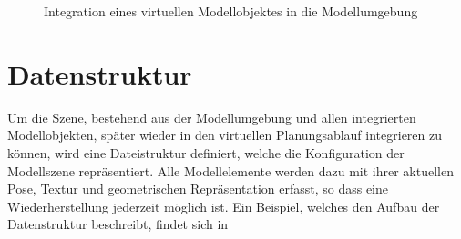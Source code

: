 \begin{figure}[ht]
	\begin{center}
	\hspace{3mm}
	\caption{Integration eines virtuellen Modellobjektes in die Modellumgebung}
	\label{fig.modobj}
	\end{center}
\end{figure}


\section{Datenstruktur}
Um die Szene, bestehend aus der Modellumgebung und allen integrierten Modellobjekten, später wieder in den virtuellen Planungsablauf integrieren zu können, wird eine Dateistruktur definiert, welche die Konfiguration der Modellszene repräsentiert. Alle Modellelemente werden dazu mit ihrer aktuellen Pose, Textur und geometrischen Repräsentation erfasst, so dass eine Wiederherstellung jederzeit möglich ist. Ein Beispiel, welches den Aufbau der Datenstruktur beschreibt, findet sich in \\